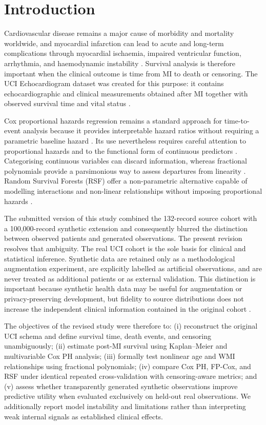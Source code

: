 \documentclass[a4paper,12pt]{article}
\begin{document}
\section{Introduction}
Cardiovascular disease remains a major cause of morbidity and mortality worldwide, and myocardial infarction can lead to acute and long-term complications through myocardial ischaemia, impaired ventricular function, arrhythmia, and haemodynamic instability \cite{ref1,ref3,ref4}. Survival analysis is therefore important when the clinical outcome is time from MI to death or censoring. The UCI Echocardiogram dataset was created for this purpose: it contains echocardiographic and clinical measurements obtained after MI together with observed survival time and vital status \cite{ref44}.

Cox proportional hazards regression remains a standard approach for time-to-event analysis because it provides interpretable hazard ratios without requiring a parametric baseline hazard \cite{ref30}. Its use nevertheless requires careful attention to proportional hazards and to the functional form of continuous predictors \cite{ref7,ref14}. Categorising continuous variables can discard information, whereas fractional polynomials provide a parsimonious way to assess departures from linearity \cite{ref10,ref36}. Random Survival Forests (RSF) offer a non-parametric alternative capable of modelling interactions and non-linear relationships without imposing proportional hazards \cite{ref38}.

The submitted version of this study combined the 132-record source cohort with a 100,000-record synthetic extension and consequently blurred the distinction between observed patients and generated observations. The present revision resolves that ambiguity. The real UCI cohort is the sole basis for clinical and statistical inference. Synthetic data are retained only as a methodological augmentation experiment, are explicitly labelled as artificial observations, and are never treated as additional patients or as external validation. This distinction is important because synthetic health data may be useful for augmentation or privacy-preserving development, but fidelity to source distributions does not increase the independent clinical information contained in the original cohort \cite{ref40,ref41}.

The objectives of the revised study were therefore to: (i) reconstruct the original UCI schema and define survival time, death events, and censoring unambiguously; (ii) estimate post-MI survival using Kaplan--Meier and multivariable Cox PH analysis; (iii) formally test nonlinear age and WMI relationships using fractional polynomials; (iv) compare Cox PH, FP-Cox, and RSF under identical repeated cross-validation with censoring-aware metrics; and (v) assess whether transparently generated synthetic observations improve predictive utility when evaluated exclusively on held-out real observations. We additionally report model instability and limitations rather than interpreting weak internal signals as established clinical effects.
\end{document}
